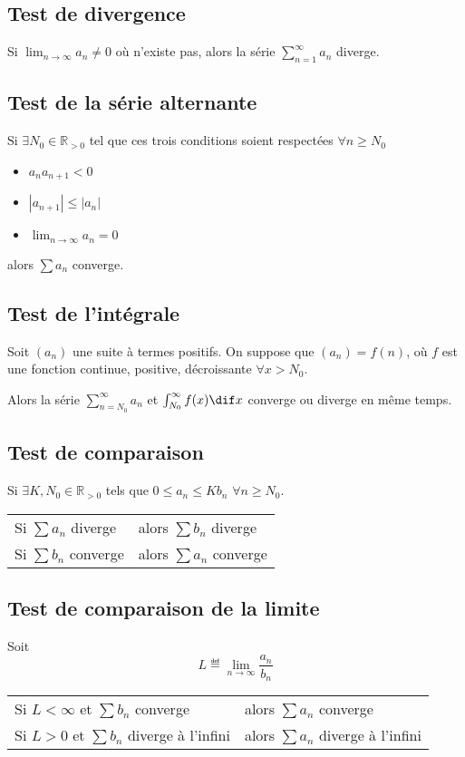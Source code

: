 \subsection{Test de divergence}
Si $\lim_{n \to \infty}a_n \neq 0$ où n'existe pas,
alors la série $\sum_{n = 1}^{\infty}a_n$ diverge.

\subsection{Test de la série alternante}
Si $\exists N_0 \in \mathbb{R}_{> 0}$ tel que
ces trois conditions soient respectées
$\forall n \geq N_0$
\begin{itemize}
  \item $a_na_{n+1} < 0$
  \item $|a_{n+1}| \leq |a_{n}|$
  \item $\lim_{n\to\infty}a_n = 0$
\end{itemize}
alors $\sum a_n$ converge.

\subsection{Test de l'intégrale}
Soit $(a_n)$ une suite à termes positifs.
On suppose que $(a_n) = f(n)$, où $f$ est une fonction continue,
positive, décroissante $\forall x > N_0$.

Alors la série $\sum_{n =N_0}^{\infty} a_n$ et
$\int_{N_0}^{\infty} f(x) \dif x$ converge ou diverge en même temps.

\subsection{Test de comparaison}
Si $\exists K, N_0 \in \mathbb{R}_{> 0}$ tels que
$0 \leq a_n \leq Kb_n$ $\forall n \geq N_0$.
\begin{center}
  \begin{tabular}{ll}
    Si $\sum a_n$ diverge & alors $\sum b_n$ diverge\\
    Si $\sum b_n$ converge & alors $\sum a_n$ converge
  \end{tabular}
\end{center}

\subsection{Test de comparaison de la limite}
Soit
\[ L \eqdef \lim_{n \to \infty} \frac{a_n}{b_n} \]
\begin{tabular}{ll}
  Si $L < \infty$ et $\sum b_n$ converge &
  alors $\sum a_n$ converge\\
  Si $L > 0$ et $\sum b_n$ diverge à l'infini &
  alors $\sum a_n$ diverge à l'infini
\end{tabular}

